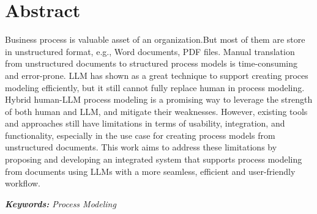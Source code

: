 \chapter*{Abstract}
\noindent

Business process is valuable asset of an organization.But most of them are store in unstructured format, e.g., Word documents, PDF files. Manual translation from unstructured documents to structured process models is time-consuming and error-prone. LLM has shown as a great technique to support creating proces modeling efficiently, but it still cannot fully replace human in process modeling. Hybrid human-LLM process modeling is a promising way to leverage the strength of both human and LLM, and mitigate their weaknesses. However, existing tools and approaches still have limitations in terms of usability, integration, and functionality, especially in the use case for creating process models from unstructured documents. This work aims to address these limitations by proposing and developing an integrated system that supports process modeling from documents using LLMs with a more seamless, efficient and user-friendly workflow.

\textit{\textbf{Keywords: }Process Modeling}
